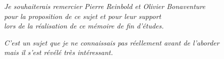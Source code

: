 \pagestyle{empty} %

\cleardoublepage

\null\vfill %

\begin{flushright}
\emph{Je souhaiterais remercier Pierre Reinbold et Olivier Bonaventure\\pour la proposition de ce sujet et pour leur support\\lors de la réalisation de ce mémoire de fin d'études.}

\emph{C'est un sujet que je ne connaissais pas réellement avant de l'aborder\\mais il s'est révélé très intéressant.}
\end{flushright}

\vfill\vfill\vfill\vfill\vfill\null %

\cleardoublepage
